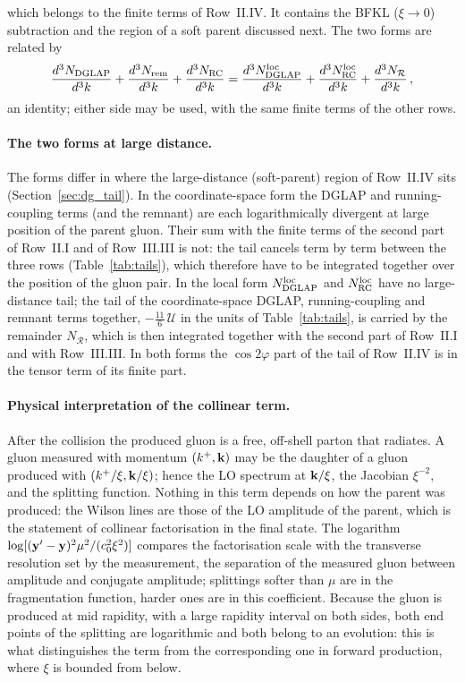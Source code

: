 which belongs to the finite terms of Row~II.IV. It contains the BFKL ($\xi\to0$) subtraction and the region of a soft parent discussed next. The two forms are related by
\begin{align}\label{eq:dg_equiv}
\frac{d^3N_{\rm DGLAP}}{d^3k}+\frac{d^3N_{\rm rem}}{d^3k}+\frac{d^3N_{\rm RC}}{d^3k}=\frac{d^3N^{\rm loc}_{\rm DGLAP}}{d^3k}+\frac{d^3N^{\rm loc}_{\rm RC}}{d^3k}+\frac{d^3N_{\mathcal R}}{d^3k}\,,
\end{align}
an identity; either side may be used, with the same finite terms of the other rows.

\paragraph{The two forms at large distance.} The forms differ in where the large-distance (soft-parent) region of Row~II.IV sits (Section~\ref{sec:dg_tail}). In the coordinate-space form the DGLAP and running-coupling terms (and the remnant) are each logarithmically divergent at large position of the parent gluon. Their sum with the finite terms of the second part of Row~II.I and of Row~III.III is not: the tail cancels term by term between the three rows (Table~\ref{tab:tails}), which therefore have to be integrated together over the position of the gluon pair. In the local form $N^{\rm loc}_{\rm DGLAP}$ and $N^{\rm loc}_{\rm RC}$ have no large-distance tail; the tail of the coordinate-space DGLAP, running-coupling and remnant terms together, $-\frac{11}{6}\,\mathcal U$ in the units of Table~\ref{tab:tails}, is carried by the remainder $N_{\mathcal R}$, which is then integrated together with the second part of Row~II.I and with Row~III.III. In both forms the $\cos2\varphi$ part of the tail of Row~II.IV is in the tensor term of its finite part.

\paragraph{Physical interpretation of the collinear term.} After the collision the produced gluon is a free, off-shell parton that radiates. A gluon measured with momentum $(k^+,\mathbf{k})$ may be the daughter of a gluon produced with $(k^+/\xi,\mathbf{k}/\xi)$; hence the LO spectrum at $\mathbf{k}/\xi$, the Jacobian $\xi^{-2}$, and the splitting function. Nothing in this term depends on how the parent was produced: the Wilson lines are those of the LO amplitude of the parent, which is the statement of collinear factorisation in the final state. The logarithm $\log[(\mathbf{y}'-\mathbf{y})^2\mu^2/(c_0^2\xi^2)]$ compares the factorisation scale with the transverse resolution set by the measurement, the separation of the measured gluon between amplitude and conjugate amplitude; splittings softer than $\mu$ are in the fragmentation function, harder ones are in this coefficient. Because the gluon is produced at mid rapidity, with a large rapidity interval on both sides, both end points of the splitting are logarithmic and both belong to an evolution: this is what distinguishes the term from the corresponding one in forward production, where $\xi$ is bounded from below.

